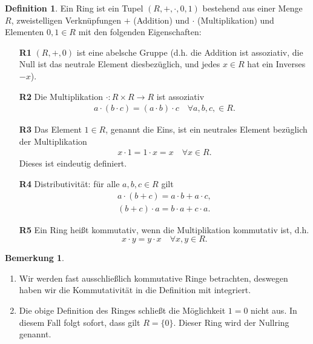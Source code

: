 \documentclass[reqno,12pt]{article}
\numberwithin{equation}{section}
\theoremstyle{plain}
\theoremstyle{definition}
\newtheorem{definition}[thm]{Definition}
\newtheorem{remark}[thm]{Bemerkung}
\begin{document}
\begin{definition}
Ein {\sf Ring} ist ein Tupel $(R, + , \cdot, 0, 1)$ bestehend aus einer Menge $R$, zweistelligen Verknüpfungen $+$ (Addition) und $\cdot$ (Multiplikation) und Elementen $0,1 \in R$ mit den folgenden Eigenschaften:
\begin{enumerate}
\item[{\bf R1}]   $(R, + , 0)$ ist eine abelsche Gruppe (d.h. die Addition ist assoziativ, die Null ist das neutrale Element diesbezüglich, und jedes $x \in R$ hat ein Inverses $-x$).
\item[{\bf R2}]   Die Multiplikation $\cdot \colon R \times R \to R$ ist assoziativ
\begin{align*}
  a \cdot  (b \cdot c) = (a \cdot b) \cdot c  \quad \forall a,b,c, \in R.
\end{align*}
\item[{\bf R3}] Das Element $1 \in R$, genannt {\sf die Eins}, ist ein neutrales Element bezüglich der Multiplikation
\begin{align*}
  x \cdot 1 = 1 \cdot x = x \quad \forall x \in R.
\end{align*}
Dieses ist eindeutig definiert.

\item[{\bf R4}]   Distributivität: für alle $a,b,c \in R$ gilt
\begin{align*}
 a \cdot (b+c) = a \cdot b + a \cdot c, \\
 (b+c) \cdot a = b \cdot a + c \cdot a.
\end{align*}

\item[{\bf R5}] Ein Ring heißt {\sf kommutativ}, wenn die Multiplikation kommutativ ist, d.h.
$$
x \cdot y = y \cdot x \quad \forall x,y \in R.
$$
\end{enumerate}

\end{definition}

\begin{remark}
\
\begin{enumerate}
  \item Wir werden fast ausschließlich  kommutative Ringe betrachten, deswegen haben wir die Kommutativität in die Definition mit integriert.
  \item Die obige Definition des Ringes schließt die Möglichkeit $1=0$ nicht aus. In diesem Fall folgt sofort, dass gilt $R=\{0\}$. Dieser Ring wird der {\sf Nullring} genannt.
\end{enumerate}
\end{remark}
\end{document}
